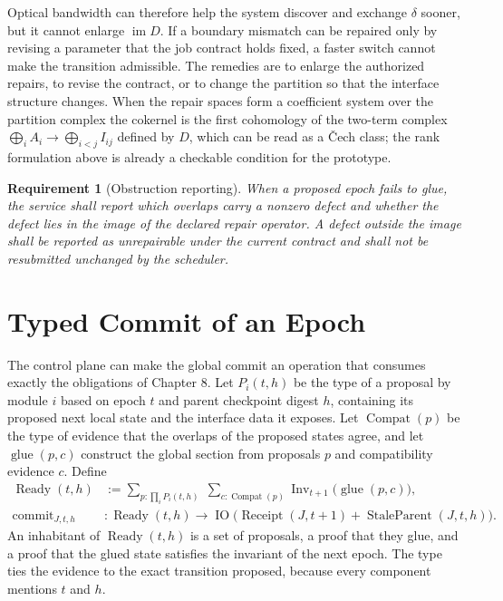 \documentclass[11pt,openany]{book}
\newtheorem{requirement}{Requirement}[chapter]
\theoremstyle{remark}
\begin{document}
Optical bandwidth can therefore help the system discover and exchange $\delta$ sooner, but it cannot enlarge $\operatorname{im}D$. If a boundary mismatch can be repaired only by revising a parameter that the job contract holds fixed, a faster switch cannot make the transition admissible. The remedies are to enlarge the authorized repairs, to revise the contract, or to change the partition so that the interface structure changes. When the repair spaces form a coefficient system over the partition complex the cokernel is the first cohomology of the two-term complex $\bigoplus_i A_i\to\bigoplus_{i<j}I_{ij}$ defined by $D$, which can be read as a Čech class; the rank formulation above is already a checkable condition for the prototype.

\begin{requirement}[Obstruction reporting]
When a proposed epoch fails to glue, the service shall report which overlaps carry a nonzero defect and whether the defect lies in the image of the declared repair operator. A defect outside the image shall be reported as unrepairable under the current contract and shall not be resubmitted unchanged by the scheduler.
\end{requirement}

\chapter{Typed Commit of an Epoch}

The control plane can make the global commit an operation that consumes exactly the obligations of Chapter 8. Let $P_i(t,h)$ be the type of a proposal by module $i$ based on epoch $t$ and parent checkpoint digest $h$, containing its proposed next local state and the interface data it exposes. Let $\operatorname{Compat}(p)$ be the type of evidence that the overlaps of the proposed states agree, and let $\operatorname{glue}(p,c)$ construct the global section from proposals $p$ and compatibility evidence $c$. Define
\[
\begin{aligned}
\operatorname{Ready}(t,h)&:=\sum_{p:\prod_i P_i(t,h)}\;\sum_{c:\operatorname{Compat}(p)}\operatorname{Inv}_{t+1}\bigl(\operatorname{glue}(p,c)\bigr),\\[0.4ex]
\operatorname{commit}_{J,t,h}&:\operatorname{Ready}(t,h)\longrightarrow\operatorname{IO}\bigl(\operatorname{Receipt}(J,t+1)+\operatorname{StaleParent}(J,t,h)\bigr).
\end{aligned}
\]
An inhabitant of $\operatorname{Ready}(t,h)$ is a set of proposals, a proof that they glue, and a proof that the glued state satisfies the invariant of the next epoch. The type ties the evidence to the exact transition proposed, because every component mentions $t$ and $h$.
\end{document}
